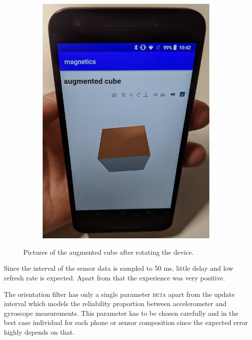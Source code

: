 \begin{figure}[hbt!]
\begin{subfigure}{0.3\textwidth}
        \includegraphics[height=1.5\linewidth]{figures/cube_bottom.jpg}
    \end{subfigure}
    \caption{Pictures of the augmented cube after rotating the device.}
    \label{fig:cubes}
\end{figure}

Since the interval of the sensor data is sampled to 50 ms, little delay and low refresh rate is expected. Apart from that the experience was very positive.

The orientation filter has only a single parameter \textsc{beta} apart from the update interval which models the reliability proportion between accelerometer and gyroscope measurements. This parameter has to be chosen carefully and in the best case individual for each phone or sensor composition since the expected error highly depends on that.

